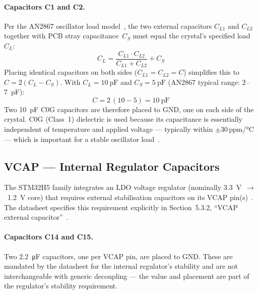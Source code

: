 \paragraph{Capacitors C1 and C2.}
Per the AN2867 oscillator load model~\cite{ref24}, the two external capacitors
$C_{L1}$ and $C_{L2}$ together with PCB stray capacitance~$C_S$ must equal the
crystal's specified load~$C_L$:
%
\begin{equation}
  C_L = \frac{C_{L1} \cdot C_{L2}}{C_{L1} + C_{L2}} + C_S
\end{equation}
%
Placing identical capacitors on both sides ($C_{L1} = C_{L2} = C$) simplifies this to
$C = 2(C_L - C_S)$. With $C_L = \SI{10}{\pico\farad}$ and
$C_S = \SI{5}{\pico\farad}$ (AN2867 typical range: 2--\SI{7}{\pico\farad}):
%
\begin{equation}
  C = 2\,(10 - 5) = \SI{10}{\pico\farad}
\end{equation}
%
Two \SI{10}{\pico\farad} C0G capacitors are therefore placed to GND, one on each side
of the crystal. C0G (Class~1) dielectric is used because its capacitance is essentially
independent of temperature and applied voltage --- typically within $\pm30$\,ppm/°C ---
which is important for a stable oscillator load~\cite{ref19,ref20}.

\subsection{VCAP --- Internal Regulator Capacitors}
\label{subsec:vcap}

The STM32H5 family integrates an LDO voltage regulator (nominally
\SI{3.3}{\volt}~$\rightarrow$~\SI{1.2}{\volt} core) that requires external stabilisation
capacitors on its VCAP pin(s)~\cite{ref1}. The datasheet specifies this requirement
explicitly in Section~5.3.2, ``VCAP external capacitor''~\cite{ref1}.

\paragraph{Capacitors C14 and C15.}
Two \SI{2.2}{\micro\farad} capacitors, one per VCAP pin, are placed to GND. These are
mandated by the datasheet for the internal regulator's stability and are not
interchangeable with generic decoupling --- the value and placement are part of the
regulator's stability requirement.

